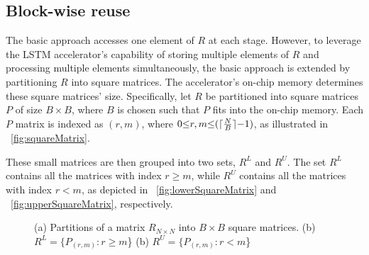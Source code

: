 \subsection{Block-wise reuse}
The basic approach accesses one element of $R$ at each stage. However, to leverage the LSTM accelerator's capability of storing multiple elements of $R$ and processing multiple elements simultaneously, the basic approach is extended by partitioning $R$ into square matrices. The accelerator's on-chip memory determines these square matrices' size. Specifically, let $R$ be partitioned into square matrices $P$ of size $B{\times}B$, where $B$ is chosen such that $P$ fits into the on-chip memory. Each $P$ matrix is indexed as $(r,m)$, where $0{\le}r,m{\le} (\lceil\frac{N}{B}\rceil{-}1)$, as illustrated in \figurename{~\ref{fig:squareMatrix}}.

These small matrices are then grouped into two sets, $R^L$ and $R^U$. The set $R^L$ contains all the matrices with index $r{\geq}m$, while $R^U$ contains all the matrices with index $r{<}m$, as depicted in \figurename{~\ref{fig:lowerSquareMatrix}} and \figurename{~\ref{fig:upperSquareMatrix}}, respectively.
\begin{figure}[htb!]
	\centering
	\caption{(a) Partitions of a matrix $R_{N{\times}N}$ into $B{\times}B$ square matrices. (b) $R^L{=}\{P_{(r,m)}:r{\geq}m$\} (b) $R^U{=}\{P_{(r,m)}:r{<}m$\}	}
	\label{fig:SquareMatrices}
\end{figure} 

